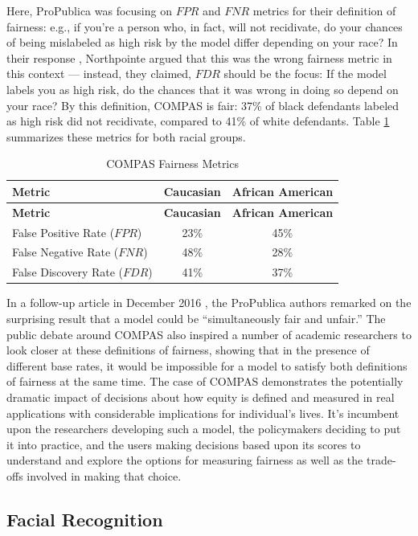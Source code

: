 \documentclass[]{krantz}
\begin{document}
Here, ProPublica was focusing on \(FPR\) and \(FNR\) metrics for their
definition of fairness: e.g., if you're a person who, in fact, will not
recidivate, do your chances of being mislabeled as high risk by the
model differ depending on your race? In their response
\citep{northpointe2016}, Northpointe argued that this was the wrong
fairness metric in this context --- instead, they claimed, \(FDR\)
should be the focus: If the model labels you as high risk, do the
chances that it was wrong in doing so depend on your race? By this
definition, COMPAS is fair: 37\% of black defendants labeled as high
risk did not recidivate, compared to 41\% of white defendants. Table
\ref{tab:compastable} summarizes these metrics for both racial groups.

\begin{longtable}[]{@{}lcc@{}}
\caption{\label{tab:compastable} COMPAS Fairness Metrics}\tabularnewline
\toprule
\textbf{Metric} & \textbf{Caucasian} & \textbf{African
American}\tabularnewline
\midrule
\endfirsthead
\toprule
\textbf{Metric} & \textbf{Caucasian} & \textbf{African
American}\tabularnewline
\midrule
\endhead
False Positive Rate (\(FPR\)) & 23\% & 45\%\tabularnewline
False Negative Rate (\(FNR\)) & 48\% & 28\%\tabularnewline
False Discovery Rate (\(FDR\)) & 41\% & 37\%\tabularnewline
\bottomrule
\end{longtable}

In a follow-up article in December 2016 \citep{angwin2016b}, the
ProPublica authors remarked on the surprising result that a model could
be ``simultaneously fair and unfair.'' The public debate around COMPAS
also inspired a number of academic researchers to look closer at these
definitions of fairness, showing that in the presence of different base
rates, it would be impossible for a model to satisfy both definitions of
fairness at the same time. The case of COMPAS demonstrates the
potentially dramatic impact of decisions about how equity is defined and
measured in real applications with considerable implications for
individual's lives. It's incumbent upon the researchers developing such
a model, the policymakers deciding to put it into practice, and the
users making decisions based upon its scores to understand and explore
the options for measuring fairness as well as the trade-offs involved in
making that choice.

\subsection{Facial Recognition}\label{facial-recognition}
\end{document}
